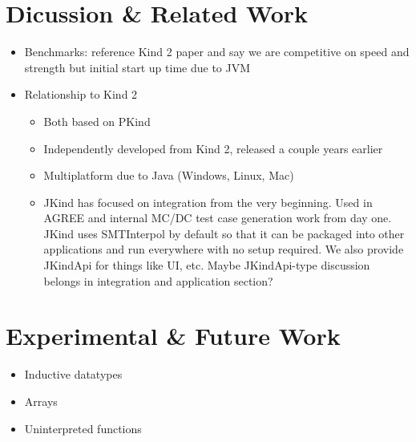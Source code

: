 \documentclass{article}
\begin{document}
\section{Dicussion \& Related Work}

\begin{itemize}
\item Benchmarks: reference Kind 2 paper and say we are competitive on
  speed and strength but initial start up time due to JVM
\item Relationship to Kind 2~\cite{champion2016cav}
  \begin{itemize}
  \item Both based on PKind
  \item Independently developed from Kind 2, released a couple years earlier
  \item Multiplatform due to Java (Windows, Linux, Mac)
  \item JKind has focused on integration from the very beginning. Used
    in AGREE and internal MC/DC test case generation work from day
    one. JKind uses SMTInterpol by default so that it can be packaged
    into other applications and run everywhere with no setup required.
    We also provide JKindApi for things like UI, etc. Maybe
    JKindApi-type discussion belongs in integration and application
    section?
  \end{itemize}
\end{itemize}

\section{Experimental \& Future Work}

\begin{itemize}
\item Inductive datatypes
\item Arrays
\item Uninterpreted functions
\end{itemize}

{}

\end{document}
